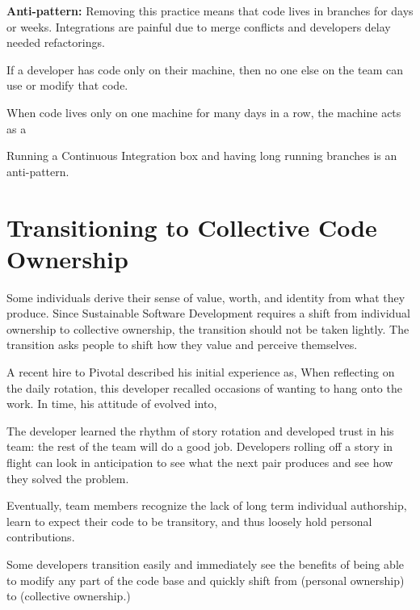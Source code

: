 \begin{table}[]
\textbf{Anti-pattern:} Removing this practice means that code lives in branches for days or weeks. Integrations are painful due to merge conflicts and developers delay needed refactorings.

If a developer has code only on their machine, then no one else on the team can use or modify that code. 

When code lives only on one machine for many days in a row, the machine acts as a  

Running a Continuous Integration box and having long running branches is an anti-pattern.


\section{Transitioning to Collective Code Ownership}
\label{Transitioning}
Some individuals derive their sense of value, worth, and identity from what they produce. Since Sustainable Software Development requires a shift from individual ownership to collective ownership, the transition should not be taken lightly. The transition asks people to shift how they value and perceive themselves. 

A recent hire to Pivotal described his initial experience as,  When reflecting on the daily rotation, this developer recalled occasions of wanting to hang onto the work.  In time, his attitude of  evolved into,  

The developer learned the rhythm of story rotation and developed trust in his team: the rest of the team will do a good job. Developers rolling off a story in flight can look in anticipation to see what the next pair produces and see how they solved the problem. 

Eventually, team members recognize the lack of long term individual authorship, learn to expect their code to be transitory, and thus loosely hold personal contributions.   

Some developers transition easily and immediately see the benefits of being able to modify any part of the code base and quickly shift from  (personal ownership) to  (collective ownership.)


\end{table}
